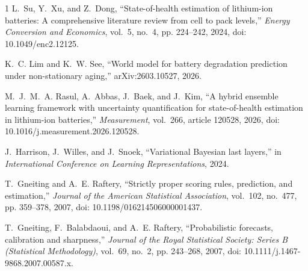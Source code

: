 \documentclass[conference]{IEEEtran}
\begin{document}
\begin{thebibliography}{1}
L.~Su, Y.~Xu, and Z.~Dong,
``State-of-health estimation of lithium-ion batteries: A comprehensive
literature review from cell to pack levels,'' \emph{Energy Conversion and
Economics}, vol.~5, no.~4, pp. 224--242, 2024,
doi: 10.1049/enc2.12125.

K.~C. Lim and K.~W. See, ``World model for battery degradation prediction under
non-stationary aging,'' arXiv:2603.10527, 2026.

M.~J.~M.~A. Rasul, A.~Abbas, J.~Baek, and J.~Kim, ``A hybrid ensemble learning
framework with uncertainty quantification for state-of-health estimation in
lithium-ion batteries,'' \emph{Measurement}, vol.~266, article 120528, 2026,
doi: 10.1016/j.measurement.2026.120528.

J.~Harrison, J.~Willes, and J.~Snoek, ``Variational Bayesian last layers,'' in
\emph{International Conference on Learning Representations}, 2024.

T.~Gneiting and A.~E. Raftery, ``Strictly proper scoring rules, prediction,
and estimation,'' \emph{Journal of the American Statistical Association},
vol.~102, no.~477, pp. 359--378, 2007,
doi: 10.1198/016214506000001437.

T.~Gneiting, F.~Balabdaoui, and A.~E. Raftery, ``Probabilistic forecasts,
calibration and sharpness,'' \emph{Journal of the Royal Statistical Society:
Series B (Statistical Methodology)}, vol.~69, no.~2, pp. 243--268, 2007,
doi: 10.1111/j.1467-9868.2007.00587.x.
\end{thebibliography}
\end{document}

